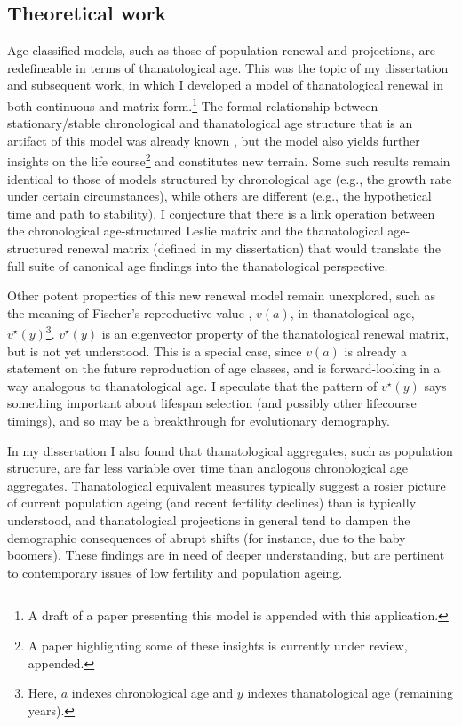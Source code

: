 \documentclass[a4paper,12pt]{article}
\begin{document}
\subsection{Theoretical work}
Age-classified models, such as those of population renewal and projections, are
redefineable in terms of thanatological age. This was the topic of my
dissertation and subsequent work, in which I developed a model of thanatological
renewal in both continuous and matrix form.\footnote{A draft of a paper
presenting this model is appended with this application.} The formal
relationship between stationary/stable chronological and thanatological age structure that is an artifact of this model was already known \cite{wachter2014essential,vaupel2009life,brouard1989mouvements}, but the model
also yields further insights on the life course\footnote{A paper highlighting
some of these insights is currently under review, appended.} and constitutes new terrain.
Some such results remain identical to those of models structured by chronological age (e.g., the growth rate under certain circumstances), while
others are different (e.g., the hypothetical time and path to stability). I
conjecture that there is a link operation between the chronological age-structured Leslie
matrix and the thanatological age-structured renewal matrix (defined in my
dissertation) that would translate the full suite of canonical age findings into
the thanatological perspective.

Other potent properties of this new renewal model remain unexplored, such
as the meaning of Fischer's reproductive value \cite{fisher1958genetical}, $v(a)$, in
thanatological age, $v^\star (y)$\footnote{Here, $a$ indexes
chronological age and $y$ indexes thanatological age (remaining years).}.
$v^\star (y)$ is an eigenvector property of the thanatological renewal matrix,
but is not yet understood. This is a special case, since $v(a)$ is already a
statement on the future reproduction of age classes, and is forward-looking in a way
analogous to thanatological age. I speculate that the pattern of $v^\star (y)$
says something important about lifespan selection (and possibly other
lifecourse timings), and so may be a breakthrough for evolutionary demography. 

In my dissertation I also found that thanatological aggregates, such as
population structure, are far less variable over time than analogous
chronological age aggregates. Thanatological equivalent measures
typically suggest a rosier picture of current population ageing (and recent
fertility declines) than is typically understood, and thanatological projections in general tend to dampen the demographic consequences of abrupt shifts (for instance, due to the baby
boomers). These findings are in need of deeper understanding, but are pertinent
to contemporary issues of low fertility and population ageing.
\end{document}
